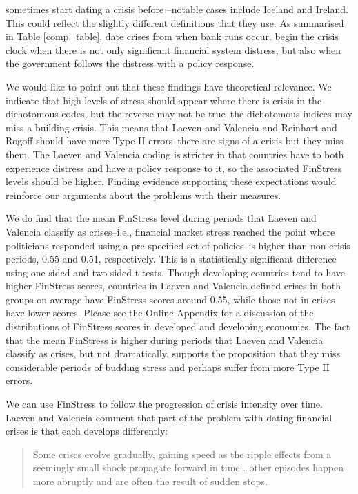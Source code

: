 \documentclass[]{article}
\begin{document}
\cite{Reinhart2009} sometimes start dating a crisis before \cite{laeven2013}--notable cases include Iceland and Ireland. This could reflect the slightly different definitions that they use. As summarised in Table \ref{comp_table}, \cite{Reinhart2009} date crises from when bank runs occur. \cite{laeven2013} begin the crisis clock when there is not only significant financial system distress, but also when the government follows the distress with a policy response.

We would like to point out that these findings have theoretical relevance. We indicate that high levels of stress should appear where there is crisis in the dichotomous codes, but the reverse may not be true--the dichotomous indices may miss a building crisis. This means that Laeven and Valencia and Reinhart and Rogoff should have more Type II errors--there are signs of a crisis but they miss them. The Laeven and Valencia coding is stricter in that countries have to both experience distress and have a policy response to it, so the associated FinStress levels should be higher. Finding evidence supporting these expectations would reinforce our arguments about the problems with their measures.

We do find that the mean FinStress level during periods that Laeven and Valencia classify as crises--i.e., financial market stress reached the point where politicians responded using a pre-specified set of policies--is higher than non-crisis periods, 0.55 and 0.51, respectively. This is a statistically significant difference using one-sided and two-sided t-tests. Though developing countries tend to have higher FinStress scores, countries in Laeven and Valencia defined crises in both groups on average have FinStress scores around 0.55, while those not in crises have lower scores. Please see the Online Appendix for a discussion of the distributions of FinStress scores in developed and developing economies. The fact that the mean FinStress is higher during periods that Laeven and Valencia classify as crises, but not dramatically, supports the proposition that they miss considerable periods of budding stress and perhaps suffer from more Type II errors.

We can use FinStress to follow the progression of crisis intensity over time. Laeven and Valencia \citeyearpar[227]{laeven2013} comment that part of the problem with dating financial crises is that each develops differently:

\begin{quote}
    Some crises evolve gradually, gaining speed as the ripple effects from a seemingly small shock propagate forward in time \ldots other episodes happen more abruptly and are often the result of sudden stops.
\end{quote}
\end{document}
